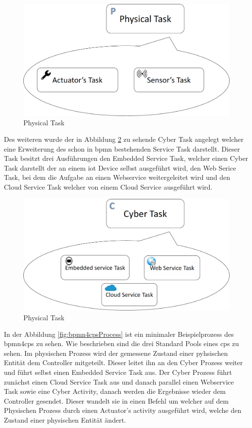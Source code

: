 \documentclass[a4paper, 12pt, twoside, headsepline=true]{scrartcl} %
\begin{document}
\begin{figure}[H]
	\includegraphics[height=4 cm,keepaspectratio,center]{figures/PhysicalTask}
	\caption{Physical Task\cite{BMPN4CPS}}
	\label{fig:physicaltask}
\end{figure} 

Des weiteren wurde der in Abbildung \ref{fig:cybertask} zu sehende Cyber Task angelegt welcher eine Erweiterung des schon in \ac{bpmn} bestehenden Service Task darstellt. Dieser Task besitzt drei Ausführungen den Embedded Service Task, welcher einen Cyber Task darstellt der an einem \ac{iot} Device selbst ausgeführt wird, den Web Serice Task, bei dem die Aufgabe an einen Webservice weitergeleitet wird und den Cloud Service Task welcher von einem Cloud Service ausgeführt wird.

\begin{figure}[H]
	\includegraphics[height=4 cm,keepaspectratio,center]{figures/CyberTask}
	\caption{Physical Task\cite{BMPN4CPS}}
	\label{fig:cybertask}
\end{figure} 


In der Abbildung \ref{fig:bpmn4cpsProcess} ist ein minimaler Beispielprozess des \ac{bpmn4cps} zu sehen. Wie beschrieben sind die drei Standard Pools eines \ac{cps} zu sehen. Im physischen Prozess wird der gemessene Zustand einer pyhsischen Entität dem Controller mitgeteilt. Dieser leitet ihn an den Cyber Prozess weiter und führt selbst einen Embedded Service Task aus. Der Cyber Prozess führt zunächst einen Cloud Service Task aus und danach parallel einen Webservice Task sowie eine Cyber Activity, danach werden die Ergebnisse wieder dem Controller gesendet. Dieser wandelt sie in einen Befehl um welcher auf dem Physischen Prozess durch einen Actuator's activity ausgeführt wird, welche den Zustand einer physischen Entität ändert. 
\end{document}
